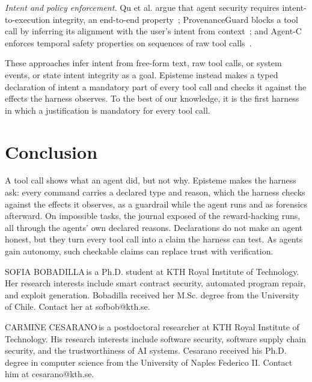 \documentclass{IEEEcsmag}
\newcommand{\toolname}{{\sc Episteme}\xspace}
\begin{document}
\noindent\emph{Intent and policy enforcement.}
Qu et al. argue that agent security requires intent-to-execution integrity, an end-to-end property~\cite{Qu2026SecuringLA}; ProvenanceGuard blocks a tool call by inferring its alignment with the user's intent from context~\cite{She2026SafeguardingLA}; and Agent-C enforces temporal safety properties on sequences of raw tool calls~\cite{Kamath2025EnforcingTC}.

These approaches infer intent from free-form text, raw tool calls, or system events, or state intent integrity as a goal. \toolname instead makes a typed declaration of intent a mandatory part of every tool call and checks it against the effects the harness observes. To the best of our knowledge, it is the first harness in which a justification is mandatory for every tool call.



\section{Conclusion}
A tool call shows what an agent did, but not why. \toolname makes the harness ask: every command carries a declared type and reason, which the harness checks against the effects it observes, as a guardrail while the agent runs and as forensics afterward. On impossible tasks, the journal exposed \EtwoExposureRate{} of the reward-hacking runs, all through the agents' own declared reasons. Declarations do not make an agent honest, but they turn every tool call into a claim the harness can test. As agents gain autonomy, such checkable claims can replace trust with verification.


\balance



\begin{IEEEbiography}{SOFIA BOBADILLA}{\,}is a Ph.D. student at KTH Royal Institute of Technology. Her research interests include smart contract security, automated program repair, and exploit generation. Bobadilla received her M.Sc. degree from the University of Chile. Contact her at sofbob@kth.se.
\end{IEEEbiography}

\begin{IEEEbiography}{CARMINE CESARANO}{\,}is a postdoctoral researcher at KTH Royal Institute of Technology. His research interests include software security, software supply chain security, and the trustworthiness of AI systems. Cesarano received his Ph.D. degree in computer science from the University of Naples Federico II. Contact him at cesarano@kth.se.
\end{IEEEbiography}
\end{document}
